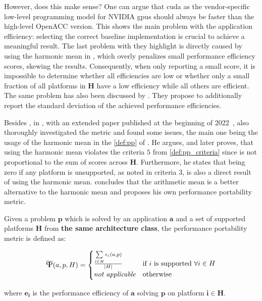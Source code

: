 However, does this make sense? 
One can argue that \gls{cuda} as the vendor-specific low-level programming model for NVIDIA \glspl{gpu} should always be faster than the high-level OpenACC version. 
This shows the main problem with the application efficiency: selecting the correct baseline implementation is crucial to achieve a meaningful result. 
The last problem with \pp they highlight is directly caused by using the harmonic mean in \pp, which overly penalizes small performance efficiency scores, skewing the results. 
Consequently, when only reporting a small \pp score, it is impossible to determine whether all efficiencies are low or whether only a small fraction of all platforms in $\mathbf{H}$ have a low efficiency while all others are efficient. 
The same problem has also been discussed by \citet{bertoni_performance_2020}. 
They propose to additionally report the standard deviation of the achieved performance efficiencies. 

Besides \citeauthor{yokota_beginners_2018}, in \citeyear{marowka_toward_2021} \citet{marowka_toward_2021}, with an extended paper published at the beginning of 2022~\cite{marowka_reformulation_2022}, also thoroughly investigated the \pp metric and found some issues, the main one being the usage of the harmonic mean in the \autoref{def:pp} of \pp. 
He argues, and later proves, that using the harmonic mean violates the criteria $5$ from \autoref{def:pp_criteria} since \pp is not proportional to the sum of scores across $\mathbf{H}$. 
Furthermore, he states that \pp being zero if any platform is unsupported, as noted in criteria $3$, is also a direct result of using the harmonic mean. 
\citeauthor{marowka_toward_2021} concludes that the arithmetic mean is a better alternative to the harmonic mean and proposes his own performance portability metric. 

\begin{definition}\label{def:mpp_provisional}
    Given a problem $\mathbf{p}$ which is solved by an application $\mathbf{a}$ and a set of supported platforms $\mathbf{H}$ from \textbf{the same architecture class}, the performance portability metric \mpp is defined as:

    \[ \mpp(a, p, H) = 
        \begin{cases}
            \frac{\sum\limits_{i \in H} e_i(a, p)}{\abs{H}} & \text{if }i\text{ is supported }\forall i \in H \\
            \textit{not applicable}                         & \text{otherwise}
        \end{cases} 
    \]

    where $\mathbf{e_i}$ is the performance efficiency of $\mathbf{a}$ solving $\mathbf{p}$ on platform $\mathbf{i \in H}$.
\end{definition}

